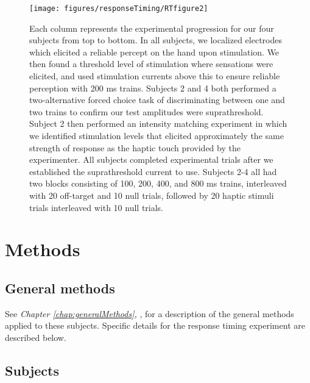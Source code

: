 \begin{figure}[ht]
	\centering
	\texttt{[image: figures/responseTiming/RTfigure2]}
	\caption[Experimental progression by subject]{Each column represents the experimental progression for our four subjects from top to bottom. In all subjects, we localized electrodes which elicited a reliable percept on the hand upon stimulation. We then found a threshold level of stimulation where sensations were elicited, and used stimulation currents above this to ensure reliable perception with 200 ms trains. Subjects 2 and 4 both performed a two-alternative forced choice task of discriminating between one and two trains to confirm our test amplitudes were suprathreshold. Subject 2 then performed an intensity matching experiment in which we identified stimulation levels that elicited approximately the same strength of response as the haptic touch provided by the experimenter. All subjects completed experimental trials after we established the suprathreshold current to use. Subjects 2-4 all had two blocks consisting of 100, 200, 400, and 800 ms trains, interleaved with 20 off-target and 10 null trials, followed by 20 haptic stimuli trials interleaved with 10 null trials. }
	\label{fig:RTsubjProgression}
\end{figure}

\section{Methods}

\subsection{General methods}

See \textit{Chapter \ref{chap:generalMethods},  },
 for a description of the general methods applied to these subjects. Specific details for the response timing experiment are described below. 
 
 
\subsection{Subjects}

